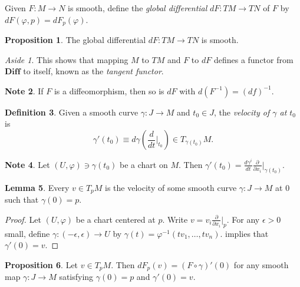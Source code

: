 \documentclass[10pt,letterpaper,cm]{nupset}
\theoremstyle{definition}
\newtheorem{definition}{Definition}[subsection]
\newtheorem{note}[definition]{Note}
\theoremstyle{theorem}
\newtheorem{lemma}[definition]{Lemma}
\newtheorem{prop}[definition]{Proposition}
\theoremstyle{remark}
\newtheorem*{aside}{Aside}
\newcommand{\1}{\mathbf{1}}
\newcommand{\0}{\vec 0}
\begin{document}
\medskip

Given $F: M \to N$ is smooth, define the \textit{global differential} $dF: TM \to TN$ of $F$ by $dF(\varphi, p) = dF_p(\varphi)$.


\begin{prop}
The global differential $dF: TM \to TN$ is smooth.
\end{prop}

\begin{aside}
This shows that mapping $M$ to $TM$ and $F$ to $dF$ defines a functor from $\mathbf{Diff}$ to itself, known as the \textit{tangent functor}.
\end{aside}

\begin{note}
If $F$ is a diffeomorphism, then so is $dF$ with $d(F^{-1}) = \left(df\right)^{-1}$.
\end{note}

\bigskip

\begin{definition}
Given a smooth curve $\gamma : J \to M$ and $t_0 \in J$, the \textit{velocity of $\gamma$ at $t_0$} is  $$\gamma'(t_0) \equiv d\gamma \left(\frac{d}{dt}\bigr\rvert_{t_0} \right) \in T_{\gamma(t_0)}M.$$
\end{definition}

\begin{note}\label{rem}
Let $\left(U, \varphi\right) \ni \gamma(t_0)$ be a chart on $M$. Then $\gamma'(t_0) = \frac{d\gamma^i}{dt} \frac{\partial}{\partial{x_i}}\bigr\rvert_{\gamma(t_0)}$.
\end{note}

\begin{lemma}
Every $v \in T_pM$ is the velocity of some smooth curve $\gamma : J \to M$ at $0$ such that $\gamma(0)=p$.
\end{lemma}
\begin{proof}
Let $\left(U, \varphi\right)$ be a chart centered at $p$. Write $v = v_i \frac{\partial}{\partial{x_i}}\bigr\rvert_{p}$. For any $\epsilon >0$ small, define $\gamma: \left({-\epsilon} , \epsilon\right) \to U$ by $\gamma(t) = \varphi^{-1}(tv_1, \ldots, tv_n)$.  implies that $\gamma'(0) = v$.
\end{proof}

\begin{prop}
Let $v \in T_pM$. Then $dF_p(v) = \left(F \circ \gamma\right)'(0)$ for any smooth map $\gamma : J \to M$ satisfying $\gamma(0)=p$ and $\gamma'(0) =v$.
\end{prop}
\end{document}
